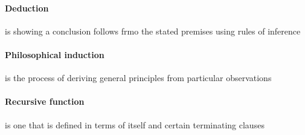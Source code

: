     \paragraph{Deduction} is showing a conclusion follows frmo the stated
    premises using rules of inference

    \paragraph{Philosophical induction} is the process of deriving general
    principles from particular observations

    \paragraph{Recursive function} is one that is defined in terms of itself
    and certain terminating clauses
